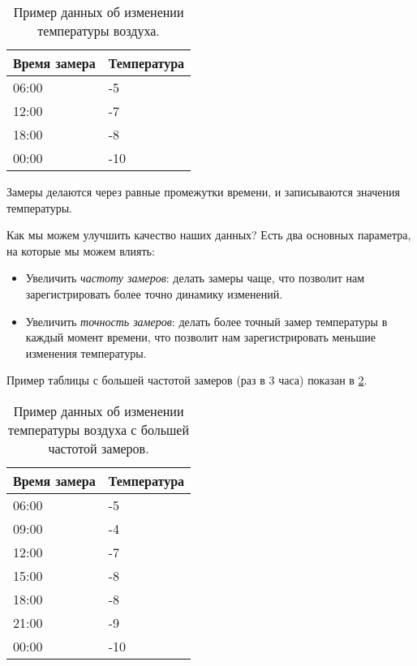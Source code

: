 \documentclass[../sparc.tex]{subfiles}
\begin{document}
\begin{table}[h]
  \centering
  \begin{tabular}{p{3cm}|p{4cm}}
    Время замера & Температура \\
    \hline \hline
    06:00 & -5 \\
    \hline
    12:00 & -7 \\
    \hline
    18:00 & -8 \\
    \hline
    00:00 & -10 \\
    \hline
  \end{tabular}
  \caption{Пример данных об изменении температуры воздуха.}
  \label{table:adc-temperature-data-example-1}
\end{table}

Замеры делаются через равные промежутки времени, и записываются значения
температуры.

Как мы можем улучшить качество наших данных?  Есть два основных параметра, на
которые мы можем влиять:

\begin{itemize}
\item Увеличить \emph{частоту замеров}: делать замеры чаще, что позволит нам
  зарегистрировать более точно динамику изменений.
\item Увеличить \emph{точность замеров}: делать более точный замер температуры в
  каждый момент времени, что позволит нам зарегистрировать меньшие изменения
  температуры.
\end{itemize}

Пример таблицы с большей частотой замеров (раз в 3 часа) показан в
\ref{table:adc-temperature-data-example-2}.

\begin{table}[h]
  \centering
  \begin{tabular}{p{3cm}|p{4cm}}
    Время замера & Температура \\
    \hline \hline
    06:00 & -5 \\
    \hline
    09:00 & -4 \\
    \hline
    12:00 & -7 \\
    \hline
    15:00 & -8 \\
    \hline
    18:00 & -8 \\
    \hline
    21:00 & -9 \\
    \hline
    00:00 & -10 \\
    \hline
  \end{tabular}
  \caption{Пример данных об изменении температуры воздуха с большей частотой
    замеров.}
  \label{table:adc-temperature-data-example-2}
\end{table}
\end{document}
